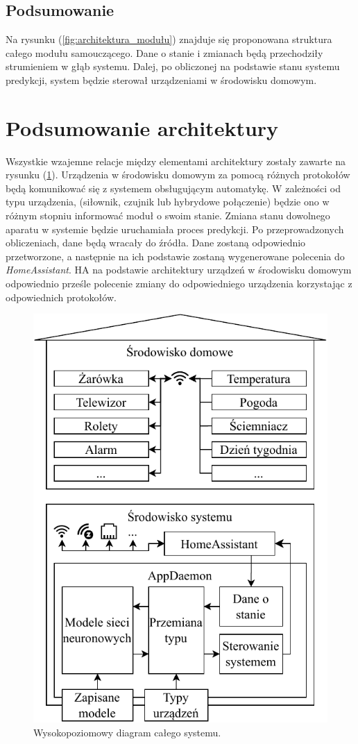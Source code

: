 \subsection{Podsumowanie}
Na rysunku (\ref{fig:architektura_modułu}) znajduje się proponowana struktura całego modułu samouczącego. Dane o stanie i zmianach będą przechodziły strumieniem w głąb systemu. Dalej, po obliczonej na podstawie stanu systemu predykcji, system będzie sterował urządzeniami w środowisku domowym.


\section{Podsumowanie architektury}
Wszystkie wzajemne relacje między elementami architektury zostały zawarte na rysunku (\ref{fig:architektura_cała}). Urządzenia w środowisku domowym za pomocą różnych protokołów będą komunikować się z systemem obsługującym automatykę. W zależności od typu urządzenia, (siłownik, czujnik lub hybrydowe połączenie) będzie ono w różnym stopniu informować moduł o swoim stanie. Zmiana stanu dowolnego aparatu w systemie będzie uruchamiała proces predykcji. Po przeprowadzonych obliczeniach, dane będą wracały do źródła. Dane zostaną odpowiednio przetworzone, a następnie na ich podstawie zostaną wygenerowane polecenia do \textit{HomeAssistant}. HA na podstawie architektury urządzeń w środowisku domowym odpowiednio prześle polecenie zmiany do odpowiedniego urządzenia korzystając z odpowiednich protokołów.

\begin{figure}[ht]
    \centering\includegraphics[width=.55\textwidth]{img/architecture_overall.pdf}
    \caption{Wysokopoziomowy diagram całego systemu.} \label{fig:architektura_cała}
\end{figure}


